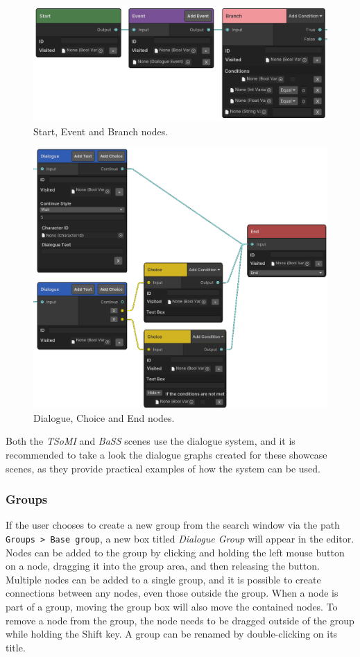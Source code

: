 \begin{figure}[H]
\centering
\includegraphics[width=1\linewidth]{img/User doc/nodes1.png}
\caption{Start, Event and Branch nodes.}
\label{fig:Manual-Nodes1}
\end{figure}
\begin{figure}[H]
\centering
\includegraphics[width=1\linewidth]{img/User doc/nodes2.png}
\caption{Dialogue, Choice and End nodes.}
\label{fig:Manual-Nodes2}
\end{figure}

Both the \textit{TSoMI} and \textit{BaSS} scenes use the dialogue system, and it is recommended to take a look the dialogue graphs created for these showcase scenes, as they provide practical examples of how the system can be used. 

\subsubsection{Groups}
If the user chooses to create a new group from the search window via the path \verb|Groups > Base group|, a new box titled \textit{Dialogue Group} will appear in the editor. Nodes can be added to the group by clicking and holding the left mouse button on a node, dragging it into the group area, and then releasing the button. Multiple nodes can be added to a single group, and it is possible to create connections between any nodes, even those outside the group. When a node is part of a group, moving the group box will also move the contained nodes. To remove a node from the group, the node needs to be dragged outside of the group while holding the Shift key. A group can be renamed by double-clicking on its title. 

